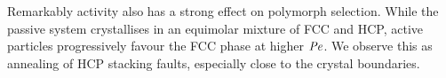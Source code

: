 Remarkably activity also has a strong effect on polymorph selection. While the passive system crystallises in an equimolar mixture of FCC and HCP, active particles progressively favour the FCC phase at higher $\operatorname{\mathit{P\kern-.08em e}}$. We observe this as annealing of HCP stacking faults, especially close to the crystal boundaries.
